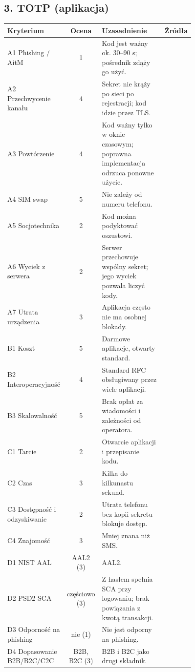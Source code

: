 \subsection*{3. TOTP (aplikacja)}
\begingroup\small
\begin{longtable}{@{}p{0.2\linewidth}c p{0.56\linewidth}l@{}}
\toprule
Kryterium & Ocena & Uzasadnienie & Źródła \\
\midrule
\endhead
A1 Phishing / AitM & 1 & Kod jest ważny ok. 30–90 s; pośrednik zdąży go użyć. & \cite{A1,S3} \\
A2 Przechwycenie kanału & 4 & Sekret nie krąży po sieci po rejestracji; kod idzie przez TLS. & \cite{S3,N1} \\
A3 Powtórzenie & 4 & Kod ważny tylko w oknie czasowym; poprawna implementacja odrzuca ponowne użycie. & \cite{S3,S4} \\
A4 SIM-swap & 5 & Nie zależy od numeru telefonu. & \cite{S3,P7} \\
A5 Socjotechnika & 2 & Kod można podyktować oszustowi. & \cite{P9,A1} \\
A6 Wyciek z serwera & 2 & Serwer przechowuje wspólny sekret; jego wyciek pozwala liczyć kody. & \cite{S3,N1} \\
A7 Utrata urządzenia & 3 & Aplikacja często nie ma osobnej blokady. & \cite{N4} \\
B1 Koszt & 5 & Darmowe aplikacje, otwarty standard. & \cite{S3,P7} \\
B2 Interoperacyjność & 4 & Standard RFC obsługiwany przez wiele aplikacji. & \cite{S3} \\
B3 Skalowalność & 5 & Brak opłat za wiadomości i zależności od operatora. & \cite{S3} \\
C1 Tarcie & 2 & Otwarcie aplikacji i przepisanie kodu. & \cite{P8,P4} \\
C2 Czas & 3 & Kilka do kilkunastu sekund. & \cite{P8} \\
C3 Dostępność i odzyskiwanie & 2 & Utrata telefonu bez kopii sekretu blokuje dostęp. & \cite{P11} \\
C4 Znajomość & 3 & Mniej znana niż SMS. & \cite{P8,P9} \\
D1 NIST AAL & AAL2 (3) & AAL2. & \cite{N1} \\
D2 PSD2 SCA & częściowo (3) & Z hasłem spełnia SCA przy logowaniu; brak powiązania z kwotą transakcji. & \cite{N3} \\
D3 Odporność na phishing & nie (1) & Nie jest odporny na phishing. & \cite{N1,A1} \\
D4 Dopasowanie B2B/B2C/C2C & B2B, B2C (3) & B2B i B2C jako drugi składnik. & \cite{N4,P7} \\
\bottomrule
\end{longtable}
\endgroup

